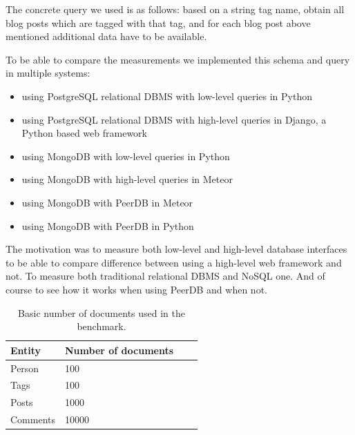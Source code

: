 The concrete query we used is as follows: based on a string tag name, obtain all blog posts which are tagged with that tag, and for each blog post above mentioned additional data have to be available.

To be able to compare the measurements we implemented this schema and query in multiple systems:
\begin{itemize}
\item using PostgreSQL relational DBMS with low-level queries in Python
\item using PostgreSQL relational DBMS with high-level queries in Django, a Python based web framework
\item using MongoDB with low-level queries in Python
\item using MongoDB with high-level queries in Meteor
\item using MongoDB with PeerDB in Meteor
\item using MongoDB with PeerDB in Python
\end{itemize}

The motivation was to measure both low-level and high-level database interfaces to be able to compare difference between using a high-level web framework and not. To measure both traditional relational DBMS and NoSQL one. And of course to see how it works when using PeerDB and when not.

\begin{table}
  \small
  \begin{center}
  \begin{tabular}{|l|l|l|l|}
    \hline
    Entity & Number of documents\\
    \hline
    Person & 100 \\
    Tags & 100 \\ 
    Posts & 1000 \\ 
    Comments & 10000 \\ 
    \hline

  \end{tabular}
  \end{center}
  \caption{Basic number of documents used in the benchmark.}
  \label{numbers}
\end{table}

